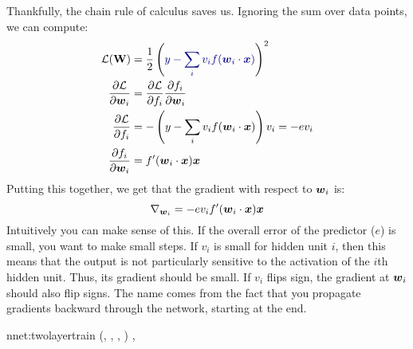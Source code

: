 Thankfully, the chain rule of calculus saves us.  Ignoring the sum
over data points, we can compute:
%
\begin{align}
\cL(\mat W) &= 
\frac 1 2 \left( \textcolor{darkblue}{y - 
     \sum_i v_i f(\dotp{\vec w_i}{\vx})}
     \right)^2
\\
\frac {\partial \cL} {\partial \vec w_i}
&= \frac {\partial \cL} {\partial f_i}
   \frac {\partial f_i}   {\partial \vec w_i}
\\
\frac {\partial \cL} {\partial f_i}
&= -\left(y - \sum_i v_i f(\dotp{\vec w_i}{\vx})\right) v_i
= -e v_i
\\
\frac {\partial f_i} {\partial \vec w_i}
&= f'(\dotp{\vec w_i}{\vx}) \vx
\end{align}
%
Putting this together, we get that the gradient with respect to
${\boldsymbol{w}}_i$ is:
%
\begin{equation}
\nabla_{{\boldsymbol{w}}_i}
= -e v_i f'({\boldsymbol{w}}_i \cdot {\boldsymbol{x}}) \boldsymbol{x}
\end{equation}
%
Intuitively you can make sense of this.  If the overall error of the
predictor ($e$) is small, you want to make small steps.  If $v_i$ is
small for hidden unit $i$, then this means that the output is not
particularly sensitive to the activation of the $i$th hidden unit.
Thus, its gradient should be small.  If $v_i$ flips sign, the gradient
at ${\boldsymbol{w}}_i$ should also flip signs.  The name
 comes from the fact that you propagate
gradients backward through the network, starting at the end.

\newalgorithm%
  {nnet:twolayertrain}%
  {(, \VAR{$\eta$}, , )}
  {
\ENDFOR
{}
\ENDFOR
\ENDFOR
{}
\ENDFOR
\RETURN {}, 
}

